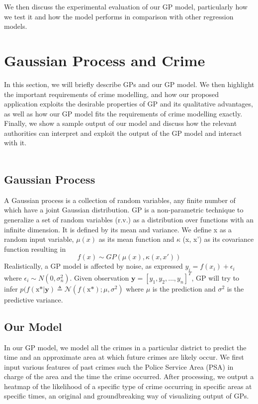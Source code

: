 \documentclass[a4paper, 10pt, conference]{ieeeconf}
\begin{document}
	We then discuss the experimental evaluation of our GP model, particularly how we test it and how the model performs in comparison with other regression models. 
	
	\section{Gaussian Process and Crime}

	In this section, we will briefly describe GPs and our GP model. We then highlight the important requirements of crime modelling, and how our proposed application exploits the desirable properties of GP and its qualitative advantages, as well as how our GP model fits the requirements of crime modelling exactly. 
	Finally, we show a sample output of our model and discuss how the relevant authorities can interpret and exploit the output of the GP model and interact with it.\\ \\

	\subsection{Gaussian Process}
	
	A Gaussian process is a collection of random variables, any finite number of which have a joint Gaussian distribution.
	GP is a non-parametric technique to generalize a set of random variables (r.v.) as a distribution over functions with an infinite dimension. \cite{c01}
	It is defined by its mean and variance. We define x as a random input variable, $\mu (x)$ as its mean function and $\kappa$ (x, x') as its covariance function resulting in \[f(x) \sim GP(\mu (x), \kappa (x, x')) \]
	Realistically, a GP model is affected by noise, as expressed $y_i = f(x_i) + \epsilon_i$ where $\epsilon_i \sim N(0, \sigma^2_n)$.
	Given observation $\mathbf{y} = [y_1, y_2, \ldots, y_n]^T$, GP will try to infer  $ p(f(\text{x*} | \textbf{y}) \triangleq \mathcal{N}(f(\text{x*}); \mu, \sigma^2)$ where $\mu$ is the prediction and $\sigma^2$ is the predictive variance. 
	
	\subsection{Our Model}
	
	In our GP model, we model all the crimes in a particular district to predict the time and an approximate area at which future crimes are likely occur.
	We first input various features of past crimes such the Police Service Area (PSA) in charge of the area and the time the crime occurred.
	After processing, we output a heatmap of the likelihood of a specific type of crime occurring in specific areas at specific times, an original and groundbreaking way of visualizing output of GPs.
	
\end{document}
